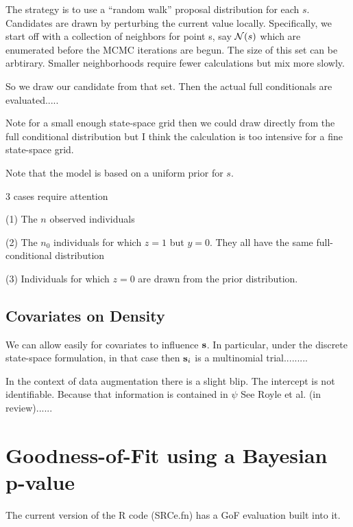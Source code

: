 \documentclass[12pt]{article}
\begin{document}
The strategy is to use a ``random walk'' proposal distribution for
each $s$.
Candidates are drawn by perturbing the current value locally. Specifically, 
we start off with a collection of neighbors for point s, say ${\cal N}(s)$ which are 
enumerated before the MCMC iterations are begun.  The size of this set can be arbtirary.
Smaller neighborhoods require fewer calculations but mix more slowly.

So we draw our candidate from that set. Then the actual full conditionals are evaluated.....

Note for a small enough state-space grid then we could draw directly from the full conditional distribution but I think
the calculation is too intensive for a fine state-space grid. 

Note that the model is based on a uniform prior for $s$.


3 cases require attention

(1) The $n$ observed individuals

(2) The $n_{0}$ individuals for which $z=1$ but $y=0$. They all have
the same full-conditional distribution

(3) Individuals for which $z=0$ are drawn from the prior distribution.
















\subsection{Covariates on Density}

We can allow easily for covariates to influence ${\bf s}$. 
In particular, under the discrete state-space formulation, in that case then
${\bf s}_{i}$ is a multinomial trial.........

In the context of data augmentation there is a slight blip. The intercept is not identifiable.
Because that information is contained in $\psi$ See Royle et al. (in review)......












\section{Goodness-of-Fit using a Bayesian p-value}

The current version of the R code (SRCe.fn) has a GoF evaluation built
into it.
\end{document}
